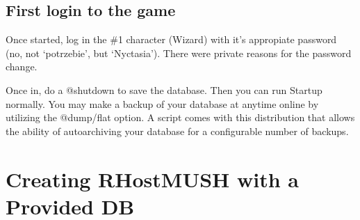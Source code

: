 \documentclass[letterpaper,10pt,english]{sphinxmanual}
\begin{document}
\begin{sphinxVerbatim}[commandchars=\\\{\}]
  \PYG{p}{[}\PYG{p}{]} 

           

      

   \PYG{p}{[}\PYG{p}{]}      
   \PYG{p}{[}\PYG{p}{]}        
\end{sphinxVerbatim}


\subsection{First login to the game}
\label{\detokenize{install:first-login-to-the-game}}
\sphinxAtStartPar
Once started, log in the \#1 character (Wizard) with it’s appropiate
password (no, not ‘potrzebie’, but ‘Nyctasia’).  There were private
reasons for the password change.

\sphinxAtStartPar
Once in, do a @shutdown to save the database.  Then you can run Startup
normally.   You may make a backup of your database at anytime on\sphinxhyphen{}line by
utilizing the @dump/flat option.  A script comes with this distribution
that allows the ability of auto\sphinxhyphen{}archiving your database for a configurable
number of backups.


\section{Creating RHostMUSH with a Provided DB}
\label{\detokenize{install:creating-rhostmush-with-a-provided-db}}
\end{document}
